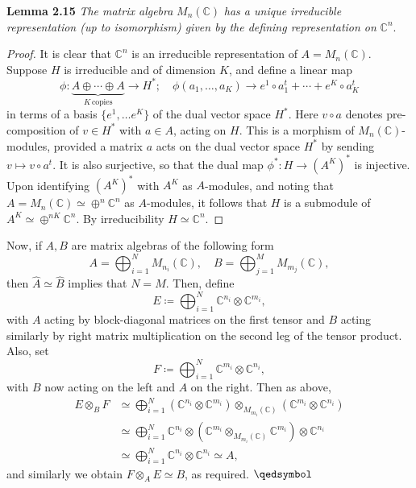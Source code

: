 \textbf{Lemma 2.15} \textit{The matrix algebra} $M_n(\mathbb{C})$ \textit{has a unique irreducible representation (up to isomorphism) given by the defining representation on } $\mathbb{C}^n$.
\begin{proof}
     It is clear that $\mathbb{C}^n$ is an irreducible representation of $A=M_n(\mathbb{C})$. Suppose $H$ is irreducible and of dimension $K$, and define a linear map
\[\phi:\underbrace{A\oplus\cdots \oplus A}_{K\, \text{copies}}\rightarrow H^*; \quad \phi(a_1,\ldots , a_K)\rightarrow e^1\circ a_1^t+\cdots+e^K\circ a^t_K\]
in terms of a basis $\{e^1,\ldots e^K\}$ of the dual vector space $H^*$. Here $v\circ a$ denotes pre-composition of $v\in H^*$ with $a\in A$, acting on $H$. This is a morphism of $M_n(\mathbb{C})$-modules, provided a matrix $a$ acts on the dual vector space $H^*$ by sending $v\mapsto v\circ a^t$. It is also surjective, so that the dual map $\phi^*:H\rightarrow (A^K)^*$ is injective. Upon identifying $(A^K)^*$ with $A^K$ as $A$-modules, and noting that $A=M_n(\mathbb{C})\simeq \oplus^n\mathbb{C}^n$ as $A$-modules, it follows that $H$ is a submodule of $A^K\simeq\oplus^{nK}\mathbb{C}^n$. By irreducibility $H\simeq \mathbb{C}^n$.
\qedhere
\end{proof}


Now, if $A, B$ are matrix algebras of the following form
\[
A=\bigoplus_{i=1}^N M_{n_i}(\mathbb{C}), \quad B=\bigoplus_{j=1}^M M_{m_j}(\mathbb{C}),
\]
then $\hat{A}\simeq\hat{B}$ implies that $N=M$. Then, define
\[
E\coloneq\bigoplus_{i=1}^N\mathbb{C}^{n_i}\otimes\mathbb{C}^{m_i},
\]
with $A$ acting by block-diagonal matrices on the first tensor and $B$ acting similarly by right matrix multiplication on the second leg of the tensor product. Also, set
\[
F\coloneq\bigoplus_{i=1}^N\mathbb{C}^{m_i}\otimes\mathbb{C}^{n_i},
\]
with $B$ now acting on the left and $A$ on the right. Then as above,
\[
\begin{split}
    E\otimes_BF &\simeq\bigoplus_{i=1}^N(\mathbb{C}^{n_i}\otimes\mathbb{C}^{m_i})\otimes_{M_{m_i}(\mathbb{C})}(\mathbb{C}^{m_i}\otimes\mathbb{C}^{n_i})\\
    &\simeq\bigoplus_{i=1}^N\mathbb{C}^{n_i}\otimes(\mathbb{C}^{m_i}\otimes_{M_{m_i}(\mathbb{C})}\mathbb{C}^{m_i})\otimes\mathbb{C}^{n_i}\\
    &\simeq\bigoplus_{i=1}^N\mathbb{C}^{n_i}\otimes\mathbb{C}^{n_i}\simeq A,
\end{split}
\]
and similarly we obtain $F\otimes_A E\simeq B$, as required. \hfill  $\qedsymbol$

